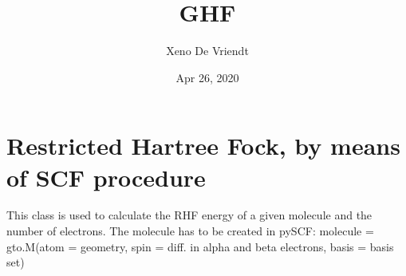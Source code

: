 \documentclass[letterpaper,10pt,english]{sphinxmanual}
\title{GHF}
\date{Apr 26, 2020}
\author{Xeno De Vriendt}
\begin{document}
\pagestyle{empty}
\sphinxmaketitle
\pagestyle{plain}
\sphinxtableofcontents
\pagestyle{normal}
\label{\detokenize{index::doc}}

\label{\detokenize{RHF:module-hf.HartreeFock.RHF}}

\chapter{Restricted Hartree Fock, by means of SCF procedure}
\label{\detokenize{RHF:restricted-hartree-fock-by-means-of-scf-procedure}}\label{\detokenize{RHF::doc}}
This class is used to calculate the RHF energy of a given molecule and the number of electrons.
The molecule has to be created in pySCF:
molecule = gto.M(atom = geometry, spin = diff. in alpha and beta electrons, basis = basis set)
\end{document}
